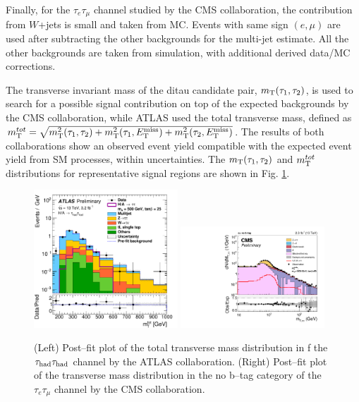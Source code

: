 Finally, for the $\tau_{e}\tau_{\mu}$ channel studied by the CMS collaboration, the contribution from $W$+jets is small and taken from MC.  Events with same sign $(e,\mu)$ are used after subtracting the other backgrounds for the multi-jet estimate. All the other backgrounds are taken from simulation, with additional derived data/MC corrections.

The transverse invariant mass of the ditau candidate pair, $m_{\rm T}(\tau_{1},\tau_{2})$, is used to search for a possible
signal contribution on top of the expected backgrounds by the CMS collaboration, while ATLAS used the total transverse mass, defined as $m_{\rm T}^{tot}=\sqrt{m_{\rm T}^{2}(\tau_{1},\tau_{2})+m_{\rm T}^{2}(\tau_{1},E_{\rm T}^{\rm miss})+m_{\rm T}^{2}(\tau_{2},E_{\rm T}^{\rm miss})}$. 
The results of both collaborations show an observed event yield compatible with the expected event yield from SM processes, within uncertainties. The $m_{\rm T}(\tau_{1},\tau_{2})$ and $m_{\rm T}^{tot}$ distributions for representative signal regions are shown in Fig. \ref{fig_1Htautau}.
\begin{figure}
\centering
\includegraphics[width=0.48\textwidth, angle=0] {figures/fig_1Htautau_a.pdf}
\includegraphics[width=0.48\textwidth, angle=0] {figures/fig_1Htautau_b.pdf}
\caption{ (Left) Post--fit plot of the total transverse mass distribution in f the $\tau_{\rm had}\tau_{\rm had}$ channel by the ATLAS collaboration. (Right) Post--fit plot of the transverse mass distribution in the no b--tag category of the $\tau_{e}\tau_{\mu}$ channel by the CMS collaboration.}
\label{fig_1Htautau}   
\end{figure}

